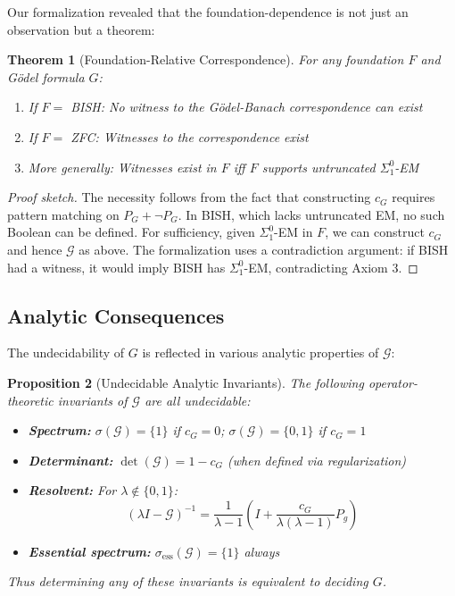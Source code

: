 \documentclass[11pt]{article}
\newtheorem{theorem}{Theorem}[section]
\newtheorem{proposition}[theorem]{Proposition}
\theoremstyle{definition}
\newcommand{\SigOne}{\Sigma^{0}_{\!1}}
\begin{document}
Our formalization revealed that the foundation-dependence is not just an observation but a theorem:

\begin{theorem}[Foundation-Relative Correspondence]\label{thm:foundation_relative}
For any foundation $F$ and Gödel formula $G$:
\begin{enumerate}
\item If $F = $ BISH: No witness to the Gödel-Banach correspondence can exist
\item If $F = $ ZFC: Witnesses to the correspondence exist  
\item More generally: Witnesses exist in $F$ iff $F$ supports untruncated $\SigOne$-EM
\end{enumerate}
\end{theorem}

\begin{proof}[Proof sketch]
The necessity follows from the fact that constructing $c_G$ requires pattern matching on $P_G + \neg P_G$. In BISH, which lacks untruncated EM, no such Boolean can be defined. For sufficiency, given $\SigOne$-EM in $F$, we can construct $c_G$ and hence $\mathcal{G}$ as above. The formalization uses a contradiction argument: if BISH had a witness, it would imply BISH has $\SigOne$-EM, contradicting Axiom 3.
\end{proof}

\subsection{Analytic Consequences}

The undecidability of $G$ is reflected in various analytic properties of $\mathcal{G}$:

\begin{proposition}[Undecidable Analytic Invariants]
The following operator-theoretic invariants of $\mathcal{G}$ are all undecidable:
\begin{itemize}
\item \textbf{Spectrum:} $\sigma(\mathcal{G}) = \{1\}$ if $c_G=0$; $\sigma(\mathcal{G}) = \{0,1\}$ if $c_G=1$
\item \textbf{Determinant:} $\det(\mathcal{G}) = 1 - c_G$ (when defined via regularization)
\item \textbf{Resolvent:} For $\lambda \notin \{0,1\}$: 
\[
(\lambda I - \mathcal{G})^{-1} = \frac{1}{\lambda-1}\left(I + \frac{c_G}{\lambda(\lambda-1)}P_g\right)
\]
\item \textbf{Essential spectrum:} $\sigma_{\text{ess}}(\mathcal{G}) = \{1\}$ always
\end{itemize}
Thus determining any of these invariants is equivalent to deciding $G$.
\end{proposition}
\end{document}
